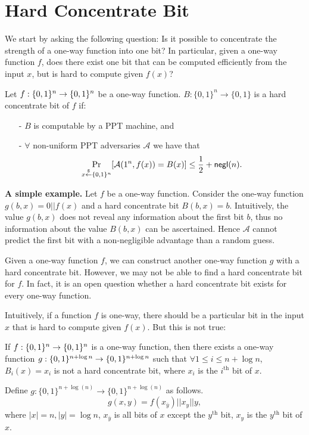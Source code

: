 \documentclass[12pt]{tufte-book}
\begin{document}
\section{Hard Concentrate Bit}
We start by asking the following question: Is it possible to concentrate the strength of a one-way function into one bit? In particular, given a one-way function $f$, does there exist one bit that can be computed efficiently from the input $x$, but is hard to compute given $f(x)$?
\begin{definition}
Let $f:\{0,1\}^{n} \rightarrow \{0,1\}^{n}$ be a one-way function.
$B:\{0,1\}^n \rightarrow \{0,1\}$ is a hard concentrate bit of $f$ if:
\begin{itemize}
\item[-] $B$ is computable by a PPT machine, and
\item[-] $\forall$ non-uniform PPT adversaries $\mathcal{A}$ we have that
	$$\Pr_{x\stackrel{\$}{\leftarrow} \{0,1\}^{n}}[\mathcal{A}(1^n, f(x)) = B(x)] \leq \frac{1}{2} + \mathsf{negl}(n).$$
\end{itemize}
\end{definition}

\noindent\textbf{A simple example.}
Let $f$ be a one-way function. Consider the one-way function $g(b, x) = 0 || f(x)$ and a hard concentrate bit $B(b, x) = b$.
Intuitively, the value $g(b, x)$ does not reveal any information about the first bit $b$, thus no information about the value $B(b, x)$ can be ascertained. Hence $\mathcal{A}$ cannot predict the first bit with a non-negligible advantage than a random guess.
\begin{remark}
Given a one-way function $f$, we can construct another one-way function $g$ with a hard concentrate bit. However, we may not be able to find a hard concentrate bit for $f$. In fact, it is an open question whether a hard concentrate bit exists for every one-way function.
\end{remark}


\bigskip
Intuitively, if a function $f$ is one-way, there should be a particular bit in the input $x$ that is hard to compute given $f(x)$. But this is not true:
\begin{claim}
If $f:\{0,1\}^{n}\rightarrow \{0,1\}^{n}$ is a one-way function, then there exists a one-way function $g:\{0,1\}^{n+\log n}\rightarrow\{0,1\}^{n+\log n}$ such that $\forall 1 \leq i \leq n+\log n$, $B_i(x) = x_i$ is not a hard concentrate bit, where $x_i$ is the $i^\text{th}$ bit of $x$.
\end{claim}
\proof
Define $g:\{0,1\}^{n+\log(n)} \rightarrow \{0,1\}^{n+\log(n)}$ as follows.
$$g(x,y) = f(x_{\bar y}) || x_y || y,$$
where $|x| = n, |y| = \log n$, $x_{\bar y}$ is all bits of $x$ except the $y^\text{th}$ bit, $x_y$ is the $y^\text{th}$ bit of $x$.
\end{document}
